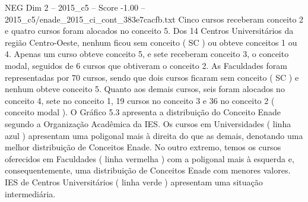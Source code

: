 \begin{textsample}{NEG Dim 2 – 2015\_c5 – Score -1.00 – 2015\_c5/enade\_2015\_ci\_cont\_383e7cacfb.txt}
Cinco cursos receberam conceito 2 e quatro cursos foram alocados no conceito 5.
Dos 14 Centros Universitários da região Centro-Oeste, nenhum ficou sem conceito ( SC ) ou obteve conceitos 1 ou 4.
Apenas um curso obteve conceito 5, e sete receberam conceito 3, o conceito modal, seguidos de 6 cursos que obtiveram o conceito 2.
As Faculdades foram representadas por 70 cursos, sendo que dois cursos ficaram sem conceito ( SC ) e nenhum obteve conceito 5.
Quanto aos demais cursos, seis foram alocados no conceito 4, sete no conceito 1, 19 cursos no conceito 3 e 36 no conceito 2 ( conceito modal ).
O Gráfico 5.3 apresenta a distribuição do Conceito Enade segundo a Organização Acadêmica da IES.
Os cursos em Universidades ( linha azul ) apresentam uma poligonal mais à direita do que as demais, denotando uma melhor distribuição de Conceitos Enade.
No outro extremo, temos os cursos oferecidos em Faculdades ( linha vermelha ) com a poligonal mais à esquerda e, consequentemente, uma distribuição de Conceitos Enade com menores valores.
IES de Centros Universitários ( linha verde ) apresentam uma situação intermediária.

\end{textsample}
